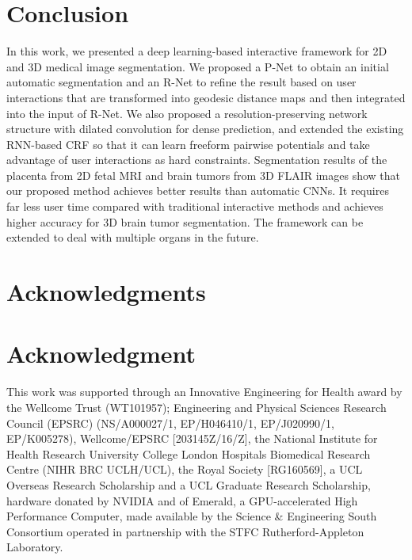 \documentclass[10pt,journal,compsoc]{IEEEtran}
\begin{document}
\section{Conclusion}
In this work, we presented a deep learning-based interactive framework for 2D and 3D medical image segmentation. We proposed a P-Net to obtain an initial automatic segmentation and an R-Net to refine the result based on user interactions that are transformed into geodesic distance maps and then integrated into the input of R-Net. We also proposed a resolution-preserving network structure with dilated convolution for dense prediction, and extended the existing RNN-based CRF so that it can learn freeform pairwise potentials and take advantage of user interactions as hard constraints. Segmentation results of the placenta from 2D fetal MRI and brain tumors from 3D FLAIR images show that our proposed method achieves better results than automatic CNNs. It requires far less user time compared with traditional interactive methods and achieves higher accuracy for 3D brain tumor segmentation. The framework can be extended to deal with multiple organs in the future.


















\ifCLASSOPTIONcompsoc
  \section*{Acknowledgments}
\else
  \section*{Acknowledgment}
\fi




This work was supported through an Innovative Engineering for Health award by the Wellcome Trust (WT101957); Engineering and Physical Sciences Research Council (EPSRC) (NS/A000027/1, EP/H046410/1, EP/J020990/1, EP/K005278), Wellcome/EPSRC [203145Z/16/Z],  the National Institute for Health Research University College London Hospitals Biomedical Research Centre (NIHR BRC UCLH/UCL), the Royal Society [RG160569], a UCL Overseas Research Scholarship and a UCL Graduate Research Scholarship, hardware donated by NVIDIA and of Emerald, a GPU-accelerated High Performance Computer, made available by the Science \& Engineering South Consortium operated in partnership with the STFC Rutherford-Appleton Laboratory.
\end{document}
